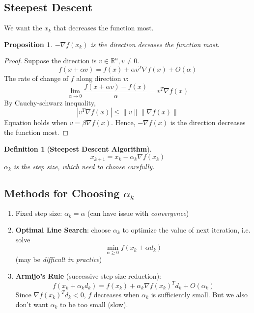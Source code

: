 \documentclass[11pt,a4paper]{article}
\newtheorem{proposition}{Proposition}
\newtheorem{definition}{Definition}
\begin{document}
\subsection{Steepest Descent}
We want the $x_k$ that decreases the function most.
\begin{proposition}
$-\nabla f(x_k)$ is the direction deceases the function most.
\end{proposition}
\begin{proof}
Suppose the direction is $v\in \mathbb{R}^n, v\neq 0$.
$$f(x+\alpha v)=f(x)+\alpha v^T \nabla f(x)+O(\alpha)$$
The rate of change of $f$ along direction $v$:
$$\lim_{\alpha \rightarrow 0}\frac{f(x+\alpha v)-f(x)}{\alpha}=v^T\nabla f(x)$$
By Cauchy-schwarz inequality,
$$|v^T\nabla f(x)|\leq \|v\|\|\nabla f(x)\|$$
Equation holds when $v=\beta \nabla f(x)$. Hence, $-\nabla f(x)$ is the direction decreases the function most.
\end{proof}

\begin{definition}[\textbf{Steepest Descent Algorithm}]
$$x_{k+1}=x_k-\alpha_k \nabla f(x_k)$$
$\alpha_k$ is the step size, which need to choose carefully.
\end{definition}

\subsection{Methods for Choosing $\alpha_k$}
\begin{enumerate}[Method (1):]
    \item Fixed step size: $\alpha_k=\alpha$ (can have issue with \textit{convergence})
    \item \textbf{Optimal Line Search}: choose $\alpha_k$ to optimize the value of next iteration, i.e. solve $$\min_{\alpha\geq 0}f(x_k+\alpha d_k)$$ (may be \textit{difficult in practice})
    \item \textbf{Armijo's Rule} (successive step size reduction):$$f(x_k+\alpha_k d_k)=f(x_k)+\alpha_k \nabla f(x_k)^T d_k+O(\alpha_k)$$
    Since $\nabla f(x_k)^T d_k<0$, $f$ decreases when $\alpha_k$ is sufficiently small. But we also don't want $\alpha_k$ to be too small (slow).

\end{enumerate}
\end{document}
